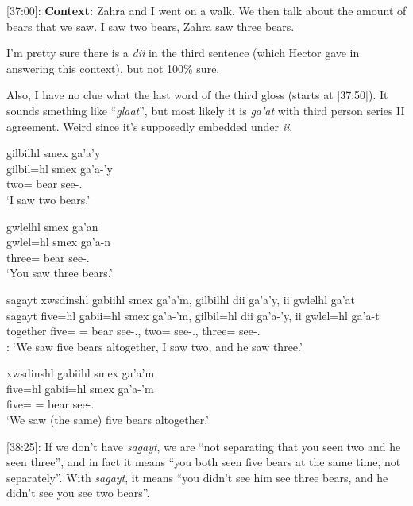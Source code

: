 [37:00]: \textbf{Context:} Zahra and I went on a walk. We then talk about the amount of bears that we saw. I saw two bears, Zahra saw three bears. 

I'm pretty sure there is a \textit{dii} \Foc{} in the third sentence (which Hector gave in answering this context), but not 100\% sure.

Also, I have no clue what the last word of the third gloss (starts at [37:50]). It sounds smething like ``\textit{glaat}'', but most likely it is \textit{ga'at} with third person series II agreement. Weird since it's supposedly embedded under \textit{ii}.

\begin{exe}
    \ex
    \begin{xlist}
    \item \glll gilbilhl smex ga'a'y \\
    gilbil=hl smex ga'a-'y\\
    two=\Cn{} bear see-\Fsg{}.\Ii{} \\
    `I saw two bears.' 
    \item \glll gwlelhl smex ga'an\\
    gwlel=hl smex ga'a-n\\
    three=\Cn{} bear see-\Ssg{}.\Ii{} \\
    `You saw three bears.' 
    \item \glll sag̱ayt xwsdinshl g̱abiihl smex ga'a'm, gilbilhl dii ga'a'y, ii gwlelhl ga'at\\
    sag̱ayt five=hl g̱abii=hl smex ga'a-'m, gilbil=hl dii ga'a-'y, ii gwlel=hl ga'a-t\\
    together five=\Cn{} \Cnt{}=\Cn{} bear see-\Fpl{}.\Ii{}, two=\Cn{} \Foc{} see-\Fsg{}.\Ii{}, \Ccnj{} three=\Cn{} see-\Tsg{}.\Ii{}  \\
    [Most likely]: `We saw five bears altogether, I saw two, and he saw three.' 
    \item \glll xwsdinshl g̱abiihl smex ga'a'm\\
    five=hl g̱abii=hl smex ga'a-'m\\
    five=\Cn{} \Cnt{}=\Cn{} bear see-\Fpl{}.\Ii{} \\
    `We saw (the same) five bears altogether.' 
    \end{xlist}
\end{exe}

[38:25]: If we don't have \textit{sag̱ayt}, we are ``not separating that you seen two and he seen three'', and in fact it means ``you both seen five bears at the same time, not separately''. With \textit{sag̱ayt}, it means ``you didn't see him see three bears, and he didn't see you see two bears''.

